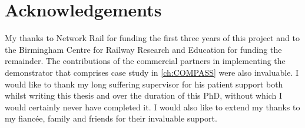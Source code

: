 



\bigskip

\begingroup
\let\clearpage\relax
\let\cleardoublepage\relax
\let\cleardoublepage\relax
\chapter*{Acknowledgements}
My thanks to Network Rail for funding the first three years of this project and to the Birmingham Centre for Railway Research and Education for funding the remainder. The contributions of the commercial partners in implementing the demonstrator that comprises case study in \autoref{ch:COMPASS} were also invaluable. 
I would like to thank my long suffering supervisor for his patient support both whilst writing this thesis and over the duration of this PhD, without which I would certainly never have completed it. 
I would also like to extend my thanks to my fiancée, family and friends for their invaluable support.

\bigskip



\endgroup



